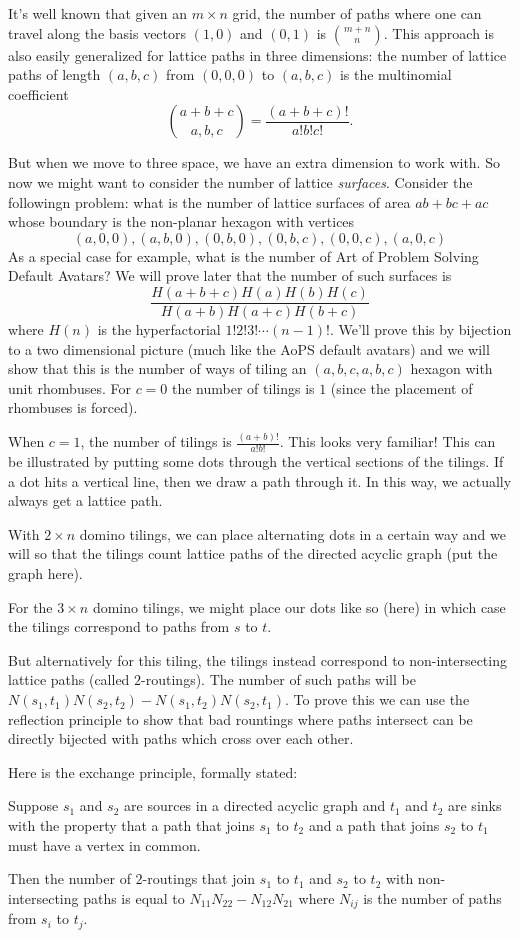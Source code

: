 It's well known that given an $m \times n$ grid, the number of paths where one can travel along the basis vectors $(1, 0)$ and $(0, 1)$ is $\binom{m + n}{n}$. This approach is also easily generalized for lattice paths in three dimensions: the number of lattice paths of length $(a, b, c)$ from $(0, 0, 0)$ to $(a, b, c)$ is the multinomial coefficient 
\[\binom{a + b + c}{a, b, c} = \frac{(a + b + c)!}{a!b!c!}.\]

But when we move to three space, we have an extra dimension to work with. So now we might want to consider the number of lattice \textit{surfaces}. Consider the followingn problem: what is the number of lattice surfaces of area $ab + bc + ac$ whose boundary is the non-planar hexagon with vertices
\[(a, 0, 0), (a, b, 0), (0, b, 0), (0, b, c), (0, 0, c), (a, 0, c)\]
As a special case for example, what is the number of Art of Problem Solving Default Avatars? We will prove later that the number of such surfaces is
\[\frac{H(a + b + c)H(a)H(b)H(c)}{H(a + b)H(a + c)H(b + c)}\] where $H(n)$ is the hyperfactorial $1!2!3!\cdots (n-1)!$.
We'll prove this by bijection to a two dimensional picture (much like the AoPS default avatars) and we will show that this is the number of ways of tiling an $(a,b,c,a,b,c)$ hexagon with unit rhombuses. For $c = 0$ the number of tilings is $1$ (since the placement of rhombuses is forced).

When $c = 1$, the number of tilings is $\frac{(a + b)!}{a!b!}$. This looks very familiar! This can be illustrated by putting some dots through the vertical sections of the tilings. If a dot hits a vertical line, then we draw a path through it. In this way, we actually always get a lattice path.

With $2 \times n$ domino tilings, we can place alternating dots in a certain way and we will so that the tilings count lattice paths of the directed acyclic graph (put the graph here).

For the $3 \times n$ domino tilings, we might place our dots like so (here) in which case the tilings correspond to paths from $s$ to $t$.

But alternatively for this tiling, the tilings instead correspond to non-intersecting lattice paths (called $2$-routings). The number of such paths will be $N(s_1, t_1)N(s_2, t_2) - N(s_1, t_2)N(s_2, t_1)$. To prove this we can use the reflection principle to show that bad rountings where paths intersect can be directly bijected with paths which cross over each other.

Here is the exchange principle, formally stated:
\begin{theorem}
Suppose $s_1$ and $s_2$ are sources in a directed acyclic graph and $t_1$ and $t_2$ are sinks with the property that a path that joins $s_1$ to $t_2$ and a path that joins $s_2$ to $t_1$ must have a vertex in common.

Then the number of $2$-routings that join $s_1$ to $t_1$ and $s_2$ to $t_2$ with non-intersecting paths is equal to $N_{11}N_{22} - N_{12}N_{21}$ where $N_{ij}$ is the number of paths from $s_i$ to $t_j$.
\end{theorem}

